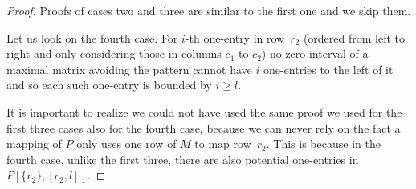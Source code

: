 \begin{proof}
Proofs of cases two and three are similar to the first one and we skip them.

Let us look on the fourth case. For $i$-th one-entry in row~$r_2$ (ordered from left to right and only considering those in columns $c_1$ to $c_2$) no zero-interval of a maximal matrix avoiding the pattern cannot have $i$ one-entries to the left of it and so each such one-entry is bounded by $i\geq l$.

It is important to realize we could not have used the same proof we used for the first three cases also for the fourth case, because we can never rely on the fact a mapping of $P$ only uses one row of $M$ to map row~$r_2$. This is because in the fourth case, unlike the first three, there are also potential one-entries in $P[\{r_2\},[c_2,l]]$.
\end{proof}

